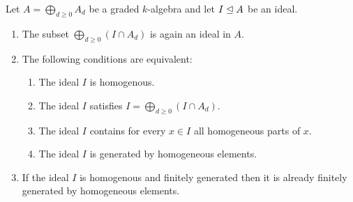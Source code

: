 \begin{lemma}
  \label{lemma: characterization of homogeneous ideals via homogeneous generators}
  Let $A = \bigoplus_{d \geq 0} A_d$ be a graded $k$-algebra and let $I \trianglelefteq A$ be an ideal.
  \begin{enumerate}
    \item
      \label{enumerate: intersection is again a graded ideal}
      The subset $\bigoplus_{d \geq 0} (I \cap A_d)$ is again an ideal in $A$.
    \item
      The following conditions are equivalent:
      \begin{enumerate}
        \item
          \label{enumerate: ideal is homogeneous}
          The ideal $I$ is homogenous.
        \item
          \label{enumerate: ideal has decomposition}
          The ideal $I$ satisfies $I = \bigoplus_{d \geq 0} (I \cap A_d)$.
        \item
          \label{enumerate: ideal contains homogenous parts}
          The ideal $I$ contains for every $x \in I$ all homogeneous parts of $x$.
        \item
          \label{enumerate: ideal is generated by homogeneous}
          The ideal $I$ is generated by homogeneous elements.
      \end{enumerate}
    \item
      If the ideal $I$ is homogenous and finitely generated then it is already finitely generated by homogeneous elements.
  \end{enumerate}
\end{lemma}


